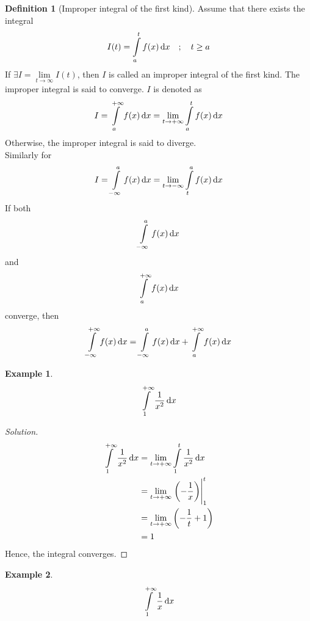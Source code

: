 \documentclass[fleqn, a4paper, 12pt]{article}
\theoremstyle{definition}
\newtheorem{example}{Example}
\newtheorem{definition}{Definition}
\theoremstyle{theorem}
\theoremstyle{remark}
\newenvironment{solution}
{\begin{proof}[Solution]\let\qed\relax}
	{\end{proof}}
\begin{document}
\begin{definition}[Improper integral of the first kind]
	Assume that there exists the integral 
	\begin{align*}
	I(t) &= \int\limits_{a}^{t}f(x) \dif x &;\quad t \geq a
	\end{align*}
	If $\exists I = \lim\limits_{t \to \infty} I(t)$, then $I$ is called an improper integral of the first kind. The improper integral is said to converge. $I$ is denoted as
	\begin{equation*}
		I = \int\limits_{a}^{+\infty} f(x) \dif x = \lim\limits_{t \to +\infty} \int\limits_{a}^{t} f(x) \dif x
	\end{equation*}
	Otherwise, the improper integral is said to diverge.\\
	Similarly for
	\begin{equation*}
		I = \int\limits_{-\infty}^{a} f(x) \dif x = \lim\limits_{t \to -\infty} \int\limits_{t}^{a} f(x) \dif x
	\end{equation*}
	If both \[\int\limits_{-\infty}^{a} f(x) \dif x\] and \[\int\limits_{a}^{+\infty} f(x) \dif x\] converge, then
	\begin{equation*}
		\int\limits_{-\infty}^{+\infty} f(x) \dif x = \int\limits_{-\infty}^{a} f(x) \dif x + \int\limits_{a}^{+\infty} f(x) \dif x
	\end{equation*}
\end{definition}

\begin{example}
	\begin{equation*}
		\int\limits_{1}^{+\infty} \dfrac{1}{x^2} \dif x
	\end{equation*}
\end{example}

\begin{solution}
	\begin{align*}
		\int\limits_{1}^{+\infty} \dfrac{1}{x^2} \dif x &= \lim\limits_{t \to +\infty} \int\limits_{1}^{t} \dfrac{1}{x^2} \dif x\\
		&= \lim\limits_{t \to +\infty} \left. \left( -\dfrac{1}{x} \right) \right\rvert_{1}^{t}\\
		&= \lim\limits_{t \to +\infty} \left( -\dfrac{1}{t} + 1 \right)\\
		&= 1
	\end{align*}
	Hence, the integral converges.
\end{solution}

\begin{example}
	\begin{equation*}
		\int\limits_{1}^{+\infty}\dfrac{1}{x} \dif x 
	\end{equation*}
\end{example}
\end{document}
